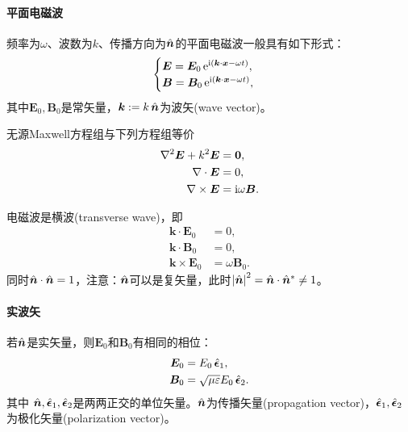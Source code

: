 \paragraph{平面电磁波}
频率为$\omega$、波数为$k$、传播方向为$\mathop{}\!\hat{\bm{n}}$的平面电磁波一般具有如下形式：
\begin{equation}
    \begin{cases}
        \bm E=\bm E_0\mathop{}\!\mathrm{e}^{\mathrm{i}(\bm k\cdot\bm x-\omega t)},\\
        \bm B=\bm B_0\mathop{}\!\mathrm{e}^{\mathrm{i}(\bm k\cdot\bm x-\omega t)},
    \end{cases}
\end{equation}
其中$\bm E_0,\bm B_0$是常矢量，$\bm k:=k\mathop{}\!\hat{\bm{n}}$为波矢(wave vector)。
\begin{theorem}{}{}
    无源Maxwell方程组与下列方程组等价
    \begin{subequations}
        \begin{align}
            \nabla^2\bm E+k^2\bm E&=\bm 0,\\
            \nabla\cdot\bm E&=0,\\
            \nabla\times\bm E&=\mathrm{i}\omega\bm B.
        \end{align}
    \end{subequations}
\end{theorem}
\begin{corollary}
    电磁波是横波(transverse wave)，即
    \begin{subequations}
        \label{eqn:transverse}
        \begin{align}
            \bm k\cdot\bm E_0&=0,\\
            \bm k\cdot\bm B_0&=0,\\
            \bm k\times\bm E_0&=\omega\bm B_0.
        \end{align}
    \end{subequations}
    同时$\mathop{}\!\hat{\bm{n}}\cdot\mathop{}\!\hat{\bm{n}}=1$，注意：$\mathop{}\!\hat{\bm{n}}$可以是复矢量，此时$\left\lvert\mathop{}\!\hat{\bm{n}}\right\rvert^2=\mathop{}\!\hat{\bm{n}}\cdot\mathop{}\!\hat{\bm{n}}^*\neq 1$。
\end{corollary}
\paragraph{实波矢}
若$\mathop{}\!\hat{\bm{n}}$是实矢量，则$\bm E_0$和$\bm B_0$有相同的相位：
\begin{subequations}
    \begin{align}
        \bm E_0&=E_0\mathop{}\!\hat{\bm{\epsilon}}_1,\\
        \bm B_0&=\sqrt{\mu\varepsilon}E_0\mathop{}\!\hat{\bm{\epsilon}}_2.
    \end{align}
\end{subequations}
其中
$\mathop{}\!\hat{\bm{n}},\mathop{}\!\hat{\bm{\epsilon}}_1,\mathop{}\!\hat{\bm{\epsilon}}_2$是两两正交的单位矢量。$\mathop{}\!\hat{\bm{n}}$为传播矢量(propagation vector)，$\mathop{}\!\hat{\bm{\epsilon}}_1,\mathop{}\!\hat{\bm{\epsilon}}_2$为极化矢量(polarization vector)。
